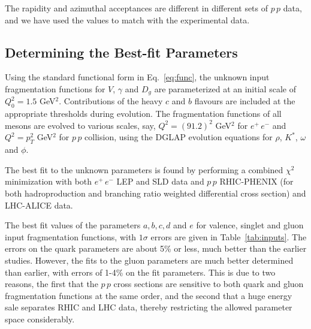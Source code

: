 \documentclass{ws-ijmpa}
\begin{document}
The rapidity and azimuthal acceptances are different in different sets
of $p\,p$ data, and we have used the values to match with the
experimental data.

\subsection{Determining the Best-fit Parameters}
\label{Bestfit}
Using the standard functional form in Eq.~\ref{eq:func}, the unknown
input fragmentation functions for $V$, $\gamma$ and $D_g$ are parameterized
at an initial scale of $Q^2_0 = 1.5$ GeV$^2$.
Contributions
of the heavy $c$ and $b$ flavours are included at the appropriate thresholds
during evolution. The fragmentation functions of all mesons are
evolved to various scales, say, $Q^2 = (91.2)^2$ GeV$^2$ for $e^+\,e^-$ and
$Q^2 = p_T^2$ GeV$^2$ for $p\,p$ collision, using the
DGLAP evolution equations\cite{Dglap1,Dglap2,Dglap3} for $\rho$,
$K^*$, $\omega$ and $\phi$.

The best fit to the unknown parameters is found by performing a
combined $\chi^2$ minimization with both $e^+\,e^-$
LEP\cite{Data,Rho1,Rho2,Rho3,Rho5,Omega1,Omega2} and
SLD\cite{SLD1,SLD2} data and $p\,p$
RHIC-PHENIX (for both hadroproduction\cite{RHIC} and branching ratio weighted 
differential cross section\cite{Ratio}) and LHC-ALICE\cite{LHC-17} data.

The best fit values of the parameters $a, b, c, d$ and $e$
for valence, singlet and gluon input fragmentation functions, with
$1\sigma$ errors are given in Table~\ref{tab:inputs}. The errors on the
quark parameters are about 5\% or less, much better than the
earlier\cite{Savinlo}
studies. However, the fits to the gluon parameters are much
better determined than earlier, with errors of 1-4\% on the fit
parameters. This is due to two reasons, the first that the $p\,p$ cross
sections are sensitive to both quark and gluon fragmentation functions
at the same order, and the second that a huge energy sale separates RHIC
and LHC data, thereby restricting the allowed parameter space
considerably.
\end{document}
